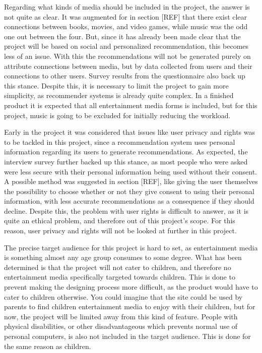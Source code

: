 Regarding what kinds of media should be included in the project, the answer is not quite as clear. It was augmented for in section [REF] that there exist clear connections between books, movies, and video games, while music was the odd one out between the four. But, since it has already been made clear that the project will be based on social and personalized recommendation, this becomes less of an issue. With this the recommendations will not be generated purely on attribute connections between media, but by data collected from users and their connections to other users. Survey results from the questionnaire also back up this stance. Despite this, it is necessary to limit the project to gain more simplicity, as recommender systems is already quite complex. In a finished product it is expected that all entertainment media forms is included, but for this project, music is going to be excluded for initially reducing the workload.

Early in the project it was considered that issues like user privacy and rights was to be tackled in this project, since a recommendation system uses personal information regarding its users to generate recommendations. As expected, the interview survey further backed up this stance, as most people who were asked were less secure with their personal information being used without their consent. A possible method was suggested in section [REF], like giving the user themselves the possibility to choose whether or not they give consent to using their personal information, with less accurate recommendations as a consequence if they should decline. Despite this, the problem with user rights is difficult to answer, as it is quite an ethical problem, and therefore out of this project’s scope. For this reason, user privacy and rights will not be looked at further in this project.

The precise target audience for this project is hard to set, as entertainment media is something almost any age group consumes to some degree. What has been determined is that the project will not cater to children, and therefore no entertainment media specifically targeted towards children. This is done to prevent making the designing process more difficult, as the product would have to cater to children otherwise. You could imagine that the site could be used by parents to find children entertainment media to enjoy with their children, but for now, the project will be limited away from this kind of feature. People with physical disabilities, or other disadvantageous which prevents normal use of personal computers, is also not included in the target audience. This is done for the same reason as children.


